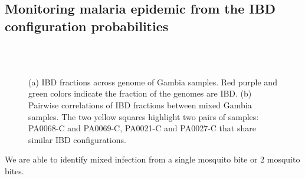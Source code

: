 \documentclass{article}
\begin{document}
\subsection{Monitoring malaria epidemic from the IBD configuration probabilities}
\begin{figure}[htp]
  \centering{}
  \\
  \\
  \caption{(a) IBD fractions across genome of Gambia samples. Red purple and green colors indicate the fraction of the genomes are IBD. (b) Pairwise correlations of IBD fractions between mixed Gambia samples. The two yellow squares highlight two pairs of samples: PA0068-C and PA0069-C, PA0021-C and PA0027-C that share similar IBD configurations.}\label{fig:gambia}
\end{figure}
We are able to identify mixed infection from a single mosquito bite or 2 mosquito bites.
\end{document}
